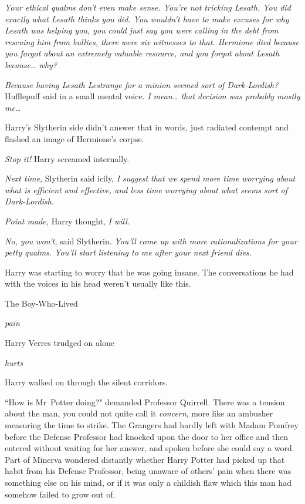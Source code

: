\emph{Your ethical qualms don't even make sense. You're not tricking Lesath. You did exactly what Lesath thinks you did. You wouldn't have to make excuses for why Lesath was helping you, you could just say you were calling in the debt from rescuing him from bullies, there were six witnesses to that. Hermione died because you forgot about an extremely valuable resource, and you forgot about Lesath because{\ldots} why?}

\emph{Because having Lesath Lestrange for a minion seemed sort of Dark-Lordish?} Hufflepuff said in a small mental voice. \emph{I mean{\ldots} that decision was probably mostly me{\ldots}}

Harry's Slytherin side didn't answer that in words, just radiated contempt and flashed an image of Hermione's corpse.

\emph{Stop it!} Harry screamed internally.

\emph{Next time,} Slytherin said icily, \emph{I suggest that we spend more time worrying about what is efficient and effective, and less time worrying about what seems sort of Dark-Lordish.}

\emph{Point made,} Harry thought, \emph{I will.}

\emph{No, you won't,} said Slytherin. \emph{You'll come up with more rationalizations for your petty qualms. You'll start listening to me after your \emph{next} friend dies.}

Harry was starting to worry that he was going insane. The conversations he had with the voices in his head weren't usually like this.

The Boy-Who-Lived

\emph{pain}

Harry Verres trudged on alone

\emph{hurts}

Harry walked on through the silent corridors.

\later

``How is Mr~Potter doing?" demanded Professor Quirrell. There was a tension about the man, you could not quite call it \emph{concern}, more like an ambusher measuring the time to strike. The Grangers had hardly left with Madam Pomfrey before the Defense Professor had knocked upon the door to her office and then entered without waiting for her answer, and spoken before she could say a word. Part of Minerva wondered distantly whether Harry Potter had picked up that habit from his Defense Professor, being unaware of others' pain when there was something else on his mind, or if it was only a childish flaw which this man had somehow failed to grow out of.

